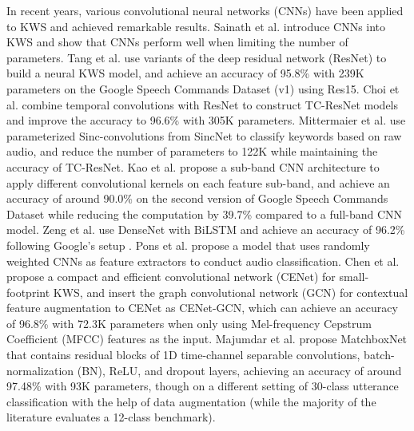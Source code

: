 \documentclass[a4paper]{article}
\begin{document}
In recent years, various convolutional neural networks (CNNs) have been applied to KWS and achieved remarkable results. Sainath et al. \cite{sainath2015convolutional} introduce CNNs into KWS and show that CNNs perform well when limiting the number of parameters. 
Tang et al. \cite{tang2018deep} use variants of the deep residual network (ResNet) to build a neural KWS model, and achieve an accuracy of 95.8\%  with 239K parameters on the Google Speech Commands Dataset (v1) \cite{warden2018speech} using Res15. 
Choi et al. \cite{choi2019temporal} combine temporal convolutions with ResNet to construct TC-ResNet models and improve the accuracy to 96.6\% with 305K parameters. 
Mittermaier et al. \cite{mittermaier2019small} use parameterized Sinc-convolutions from SincNet to classify keywords based on raw audio, and reduce the number of parameters to 122K while maintaining the accuracy of TC-ResNet.
Kao et al. \cite{kao2019sub} propose a sub-band CNN architecture to apply different convolutional kernels on each feature sub-band, and achieve an accuracy of around 90.0\% on the second version of Google Speech Commands Dataset while reducing the computation by 39.7\% compared to a full-band CNN model. Zeng et al. \cite{zeng2019effective} use DenseNet with BiLSTM and achieve an accuracy of 96.2\% following Google's setup \cite{sainath2015convolutional}.
Pons et al. \cite{pons2019randomly} propose a model that uses randomly weighted CNNs as feature extractors to conduct audio classification.
Chen et al. \cite{chen2019small} propose a compact and efficient convolutional network (CENet) for small-footprint KWS, and insert the graph convolutional network (GCN) for contextual feature augmentation to CENet as CENet-GCN, which can achieve an accuracy of 96.8\% with 72.3K parameters when only using Mel-frequency Cepstrum Coefficient (MFCC) features as the input.     
Majumdar et al. \cite{majumdar2020matchboxnet} propose MatchboxNet that contains residual blocks of 1D time-channel separable convolutions, batch-normalization (BN), ReLU, and dropout layers, achieving an accuracy of around 97.48\% with 93K parameters, though on a different setting of 30-class utterance classification with the help of data augmentation (while the majority of the literature evaluates a 12-class benchmark). 
\end{document}
